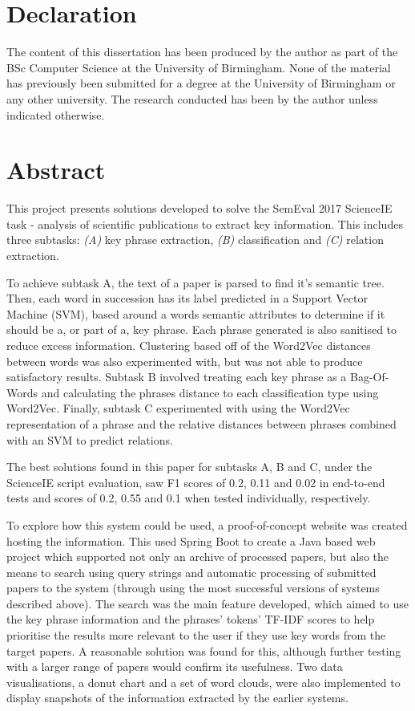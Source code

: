\documentclass[a4paper]{report}
\begin{document}

\section*{Declaration}
The content of this dissertation has been produced by the author as part of the BSc Computer Science at the University of Birmingham. None of the material has previously been submitted for a degree at the University of Birmingham or any other university. The research conducted has been by the author unless indicated otherwise.

\pagebreak

\section*{Abstract}
This project presents solutions developed to solve the SemEval 2017 ScienceIE task - analysis of scientific publications to extract key information. This includes three subtasks: \textit{(A)} key phrase extraction, \textit{(B)} classification and \textit{(C)} relation extraction.

To achieve subtask A, the text of a paper is parsed to find it's semantic tree. Then, each word in succession has its label predicted in a Support Vector Machine (SVM), based around a words semantic attributes to determine if it should be a, or part of a, key phrase. Each phrase generated is also sanitised to reduce excess information. Clustering based off of the Word2Vec distances between words was also experimented with, but was not able to produce satisfactory results. Subtask B involved treating each key phrase as a Bag-Of-Words and calculating the phrases distance to each classification type using Word2Vec. Finally, subtask C experimented with using the Word2Vec representation of a phrase and the relative distances between phrases combined with an SVM to predict relations.

The best solutions found in this paper for subtasks A, B and C, under the ScienceIE script evaluation, saw F1 scores of 0.2, 0.11 and 0.02 in end-to-end tests and scores of 0.2, 0.55 and 0.1 when tested individually, respectively. 

To explore how this system could be used, a proof-of-concept website was created hosting the information. This used Spring Boot to create a Java based web project which supported not only an archive of processed papers, but also the means to search using query strings and automatic processing of submitted papers to the system (through using the most successful versions of systems described above). The search was the main feature developed, which aimed to use the key phrase information and the phrases' tokens' TF-IDF scores to help prioritise the results more relevant to the user if they use key words from the target papers. A reasonable solution was found for this, although further testing with a larger range of papers would confirm its usefulness. Two data visualisations, a donut chart and a set of word clouds, were also implemented to display snapshots of the information extracted by the earlier systems. \\
\end{document}
